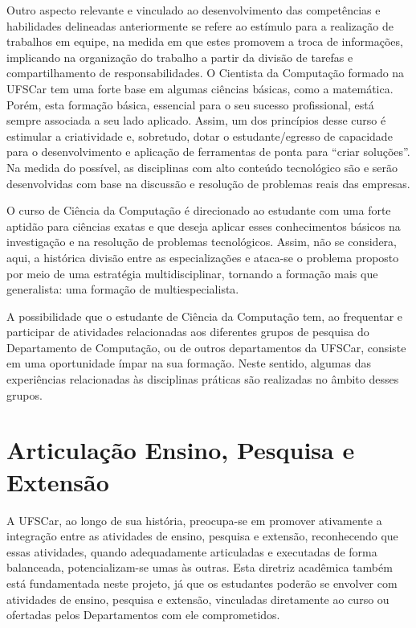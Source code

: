 Outro aspecto relevante e vinculado ao desenvolvimento das competências e habilidades delineadas anteriormente se refere ao estímulo para a realização de trabalhos em equipe, na medida em que estes promovem a troca de informações, implicando na organização do trabalho a partir da divisão de tarefas e compartilhamento de responsabilidades.
O Cientista da Computação formado na UFSCar tem uma forte base em algumas ciências básicas, como a matemática. Porém, esta formação básica, essencial para o seu sucesso profissional, está sempre associada a seu lado aplicado. Assim, um dos princípios desse curso é estimular a criatividade e, sobretudo, dotar o estudante/egresso de capacidade para o desenvolvimento e aplicação de ferramentas de ponta para ``criar soluções''. Na medida do possível, as disciplinas com alto conteúdo tecnológico são e serão desenvolvidas com base na discussão e resolução de problemas reais das empresas.

O curso de Ciência da Computação é direcionado ao estudante com uma forte aptidão para ciências exatas e que deseja aplicar esses conhecimentos básicos na investigação e na resolução de problemas tecnológicos. Assim, não se considera, aqui,  a histórica divisão entre as especializações e ataca-se o problema proposto por meio de uma estratégia multidisciplinar, tornando a formação mais que generalista: uma formação de multiespecialista.

A possibilidade que o estudante de Ciência da Computação tem, ao frequentar e participar de atividades relacionadas aos diferentes grupos de pesquisa do Departamento de Computação, ou de outros departamentos da UFSCar, consiste em uma oportunidade ímpar na sua formação. Neste sentido, algumas das experiências relacionadas às disciplinas práticas são realizadas no âmbito desses grupos.


\section{Articulação Ensino, Pesquisa e Extensão}

A UFSCar, ao longo de sua história, preocupa-se em promover ativamente a integração entre as atividades de ensino, pesquisa e extensão, reconhecendo que essas atividades, quando adequadamente articuladas e executadas de forma balanceada, potencializam-se umas às outras. Esta diretriz acadêmica também está fundamentada neste projeto, já que os estudantes poderão se envolver com atividades de ensino, pesquisa e extensão, vinculadas diretamente ao curso ou ofertadas pelos Departamentos com ele comprometidos. 



